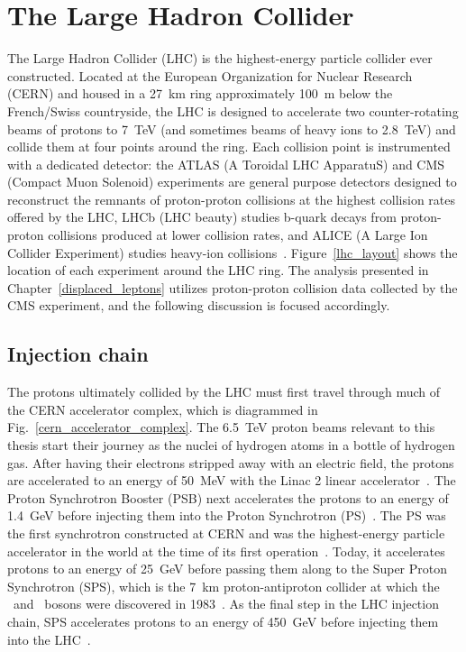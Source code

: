 \section{The Large Hadron Collider}
The Large Hadron Collider (LHC) is the highest-energy particle collider ever constructed. Located at the European Organization for Nuclear Research (CERN) and housed in a \SI{27}{\km} ring approximately \SI{100}{\m} below the French/Swiss countryside, the LHC is designed to accelerate two counter-rotating beams of protons to \SI{7}{\TeV} (and sometimes beams of heavy ions to \SI{2.8}{\TeV}) and collide them at four points around the ring. Each collision point is instrumented with a dedicated detector: the ATLAS (A Toroidal LHC ApparatuS) and CMS (Compact Muon Solenoid) experiments are general purpose detectors designed to reconstruct the remnants of proton-proton collisions at the highest collision rates offered by the LHC, LHCb (LHC beauty) studies b-quark decays from proton-proton collisions produced at lower collision rates, and ALICE (A Large Ion Collider Experiment) studies heavy-ion collisions~\cite{lhc_machine}. Figure~\ref{lhc_layout} shows the location of each experiment around the LHC ring. The analysis presented in Chapter~\ref{displaced_leptons} utilizes proton-proton collision data collected by the CMS experiment, and the following discussion is focused accordingly.



\subsection{Injection chain}
The protons ultimately collided by the LHC must first travel through much of the CERN accelerator complex, which is diagrammed in Fig.~\ref{cern_accelerator_complex}. The \SI{6.5}{\TeV} proton beams relevant to this thesis start their journey as the nuclei of hydrogen atoms in a bottle of hydrogen gas. After having their electrons stripped away with an electric field, the protons are accelerated to an energy of \SI{50}{\MeV} with the Linac 2 linear accelerator~\cite{linac2}. The Proton Synchrotron Booster (PSB) next accelerates the protons to an energy of \SI{1.4}{\GeV} before injecting them into the Proton Synchrotron (PS)~\cite{psb}. The PS was the first synchrotron constructed at CERN and was the highest-energy particle accelerator in the world at the time of its first operation~\cite{cern_annual_report_1959}. Today, it accelerates protons to an energy of \SI{25}{\GeV} before passing them along to the Super Proton Synchrotron (SPS), which is the \SI{7}{\km} proton-antiproton collider at which the \PWpm\ and \cPZ\ bosons were discovered in 1983~\cite{sps}. As the final step in the LHC injection chain, SPS accelerates protons to an energy of \SI{450}{\GeV} before injecting them into the LHC~\cite{lhc_machine}.

